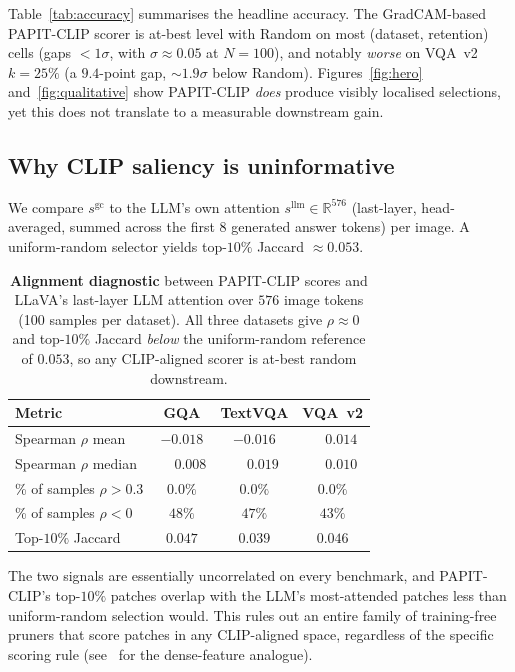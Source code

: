 \documentclass[10pt,twocolumn,letterpaper]{article}
\begin{document}
Table~\ref{tab:accuracy} summarises the headline accuracy. The
GradCAM-based PAPIT-CLIP scorer is at-best level with Random on
most (dataset, retention) cells (gaps ${<}1\sigma$, with
$\sigma\!\approx\!0.05$ at $N{=}100$), and notably \emph{worse} on
VQA~v2 $k\!=\!25\%$ (a $9.4$-point gap, ${\sim}1.9\sigma$ below
Random). Figures~\ref{fig:hero} and~\ref{fig:qualitative} show
PAPIT-CLIP \emph{does} produce visibly localised selections, yet
this does not translate to a measurable downstream gain.

\subsection{Why CLIP saliency is uninformative}
\label{sec:diagnostic}

We compare $s^{\text{gc}}$ to the LLM's own attention
$s^{\text{llm}}\!\in\!\mathbb{R}^{576}$ (last-layer, head-averaged,
summed across the first $8$ generated answer tokens) per image. A
uniform-random selector yields top-$10\%$ Jaccard
${\approx}0.053$.

\begin{table}[t]
\centering
\small
\caption{\textbf{Alignment diagnostic} between PAPIT-CLIP scores and
LLaVA's last-layer LLM attention over $576$ image tokens
(100 samples per dataset). All three datasets give $\rho{\approx}0$
and top-$10\%$ Jaccard \emph{below} the uniform-random reference of
$0.053$, so any CLIP-aligned scorer is at-best random downstream.}
\label{tab:diagnostic}
\begin{tabular}{@{}lccc@{}}
\toprule
Metric & GQA & TextVQA & VQA~v2 \\
\midrule
Spearman $\rho$ mean   & $-0.018$ & $-0.016$ & $\phantom{-}0.014$ \\
Spearman $\rho$ median & $\phantom{-}0.008$ & $\phantom{-}0.019$ & $\phantom{-}0.010$ \\
\% of samples $\rho\!>\!0.3$    & $0.0\%$ & $0.0\%$ & $0.0\%$ \\
\% of samples $\rho\!<\!0$      & $48\%$ & $47\%$ & $43\%$ \\
Top-$10\%$ Jaccard               & $0.047$ & $0.039$ & $0.046$ \\
\bottomrule
\end{tabular}
\end{table}

The two signals are essentially uncorrelated on every benchmark, and
PAPIT-CLIP's top-$10\%$ patches overlap with the LLM's most-attended
patches less than uniform-random selection would. This rules out an
entire family of training-free pruners that score patches in any
CLIP-aligned space, regardless of the specific scoring rule
(see~\cite{zhou2022maskclip} for the dense-feature analogue).
\end{document}
